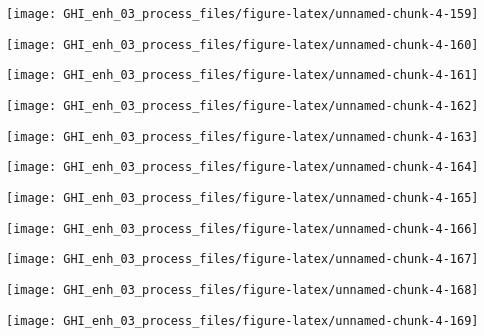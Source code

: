 \documentclass[
  10pt,
  a4paper,oneside]{article}
\begin{document}
\begin{center}\texttt{[image: GHI\_enh\_03\_process\_files/figure-latex/unnamed-chunk-4-159]} \end{center}

\begin{center}\texttt{[image: GHI\_enh\_03\_process\_files/figure-latex/unnamed-chunk-4-160]} \end{center}

\begin{center}\texttt{[image: GHI\_enh\_03\_process\_files/figure-latex/unnamed-chunk-4-161]} \end{center}

\begin{center}\texttt{[image: GHI\_enh\_03\_process\_files/figure-latex/unnamed-chunk-4-162]} \end{center}

\begin{center}\texttt{[image: GHI\_enh\_03\_process\_files/figure-latex/unnamed-chunk-4-163]} \end{center}

\begin{center}\texttt{[image: GHI\_enh\_03\_process\_files/figure-latex/unnamed-chunk-4-164]} \end{center}

\begin{center}\texttt{[image: GHI\_enh\_03\_process\_files/figure-latex/unnamed-chunk-4-165]} \end{center}

\begin{center}\texttt{[image: GHI\_enh\_03\_process\_files/figure-latex/unnamed-chunk-4-166]} \end{center}

\begin{center}\texttt{[image: GHI\_enh\_03\_process\_files/figure-latex/unnamed-chunk-4-167]} \end{center}

\begin{center}\texttt{[image: GHI\_enh\_03\_process\_files/figure-latex/unnamed-chunk-4-168]} \end{center}

\begin{center}\texttt{[image: GHI\_enh\_03\_process\_files/figure-latex/unnamed-chunk-4-169]} \end{center}
\end{document}
